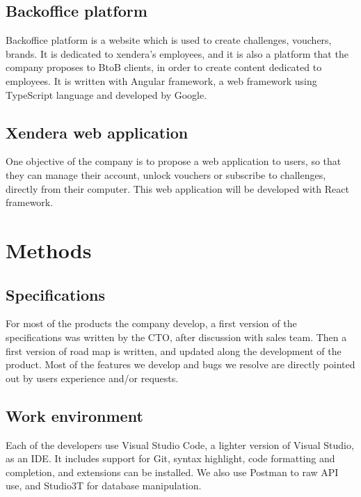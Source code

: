 \documentclass{article}
\begin{document}
            \subsection{Backoffice platform}
                Backoffice platform is a website which is used to create challenges, vouchers, brands.
                It is dedicated to xendera's employees, and it is also a platform that the company proposes 
                to BtoB clients, in order to create content dedicated to employees. It is written with Angular 
                framework, a web framework using TypeScript language and developed by Google.
            
            \subsection{Xendera web application}
                One objective of the company is to propose a web application to users, so that they can manage
                their account, unlock vouchers or subscribe to challenges, directly from their computer. This
                web application will be developed with React framework.
        \newpage
        \section{Methods}
            \subsection{Specifications}
                For most of the products the company develop, a first version of the specifications
                was written by the CTO, after discussion with sales team. Then a first version
                of road map is written, and updated along the development of the product.
                Most of the features we develop and bugs we resolve are directly pointed out by
                users experience and/or requests.

            \subsection{Work environment}
                Each of the developers use Visual Studio Code, a lighter version of Visual Studio,
                as an IDE. It includes support for Git, syntax highlight, code 
                formatting and completion, and extensions can be installed.\newline
                We also use Postman to raw API use, and Studio3T for database manipulation. 
\end{document}
